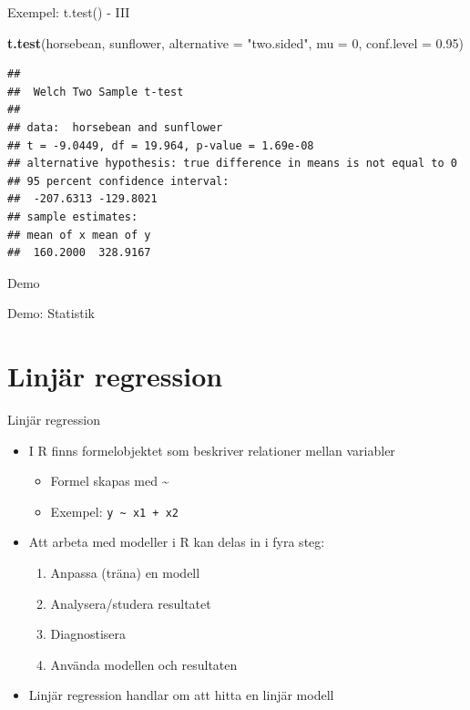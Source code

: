 \documentclass[
  11pt,
  ignorenonframetext,
  handout]{beamer}
\newenvironment{Shaded}{\begin{snugshade}}{\end{snugshade}}
\newcommand{\AttributeTok}[1]{\textcolor[rgb]{0.13,0.29,0.53}{#1}}
\newcommand{\DecValTok}[1]{\textcolor[rgb]{0.00,0.00,0.81}{#1}}
\newcommand{\FloatTok}[1]{\textcolor[rgb]{0.00,0.00,0.81}{#1}}
\newcommand{\FunctionTok}[1]{\textcolor[rgb]{0.13,0.29,0.53}{\textbf{#1}}}
\newcommand{\NormalTok}[1]{#1}
\newcommand{\StringTok}[1]{\textcolor[rgb]{0.31,0.60,0.02}{#1}}
\providecommand{\tightlist}{%
  \setlength{\itemsep}{0pt}\setlength{\parskip}{0pt}}
\begin{document}
\begin{frame}[fragile]{Exempel: t.test() - III}
\label{exempel-t.test---iii}
\begin{Shaded}
\begin{Highlighting}[]
\FunctionTok{t.test}\NormalTok{(horsebean, sunflower,}
       \AttributeTok{alternative =} \StringTok{"two.sided"}\NormalTok{,}
       \AttributeTok{mu =} \DecValTok{0}\NormalTok{, }\AttributeTok{conf.level =} \FloatTok{0.95}\NormalTok{)}
\end{Highlighting}
\end{Shaded}

\begin{verbatim}
## 
##  Welch Two Sample t-test
## 
## data:  horsebean and sunflower
## t = -9.0449, df = 19.964, p-value = 1.69e-08
## alternative hypothesis: true difference in means is not equal to 0
## 95 percent confidence interval:
##  -207.6313 -129.8021
## sample estimates:
## mean of x mean of y 
##  160.2000  328.9167
\end{verbatim}
\end{frame}

\begin{frame}{Demo}
\label{demo-1}
\begin{block}{Demo: Statistik}
\label{demo-statistik}
\end{block}
\end{frame}

\section{Linjär regression}\label{linjuxe4r-regression}

\begin{frame}[fragile]{Linjär regression}
\label{linjuxe4r-regression-1}
\begin{itemize}
\tightlist
\item
  I R finns formelobjektet som beskriver relationer mellan variabler

  \begin{itemize}
  \tightlist
  \item
    Formel skapas med \textasciitilde{}
  \item
    Exempel: \texttt{y\ \textasciitilde{}\ x1\ +\ x2}
  \end{itemize}
\item
  Att arbeta med modeller i R kan delas in i fyra steg:

  \begin{enumerate}
  \tightlist
  \item
    Anpassa (träna) en modell
  \item
    Analysera/studera resultatet
  \item
    Diagnostisera
  \item
    Använda modellen och resultaten
  \end{enumerate}
\item
  Linjär regression handlar om att hitta en linjär modell
\end{itemize}
\end{frame}
\end{document}
